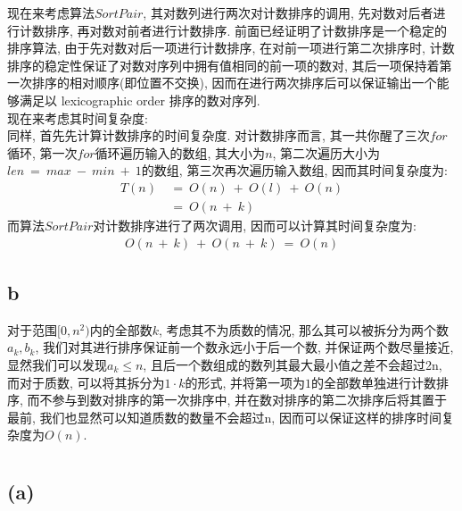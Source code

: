 \documentclass{article}
\begin{document}
现在来考虑算法$SortPair$, 其对数列进行两次对计数排序的调用, 先对数对后者进行计数排序, 再对数对前者进行计数排序. 前面已经证明了计数排序是一个稳定的排序算法, 由于先对数对后一项进行计数排序, 在对前一项进行第二次排序时, 计数排序的稳定性保证了对数对序列中拥有值相同的前一项的数对, 其后一项保持着第一次排序的相对顺序(即位置不交换), 因而在进行两次排序后可以保证输出一个能够满足以 lexicographic order 排序的数对序列. \\
现在来考虑其时间复杂度: \\
同样, 首先先计算计数排序的时间复杂度. 对计数排序而言, 其一共你醒了三次$for$循环, 第一次$for$循环遍历输入的数组, 其大小为$n$, 第二次遍历大小为$len\ =\ max\ -\ min\ +\ 1$的数组, 第三次再次遍历输入数组, 因而其时间复杂度为: 
\begin{align*}
T(n)\ &=\ O(n)\ +\ O(l)\ +\ O(n) \\
&=\ O(n\ +\ k)
\end{align*}
而算法$SortPair$对计数排序进行了两次调用, 因而可以计算其时间复杂度为:
\begin{align*}
O(n\ +\ k)\ +\ O(n\ +\ k)\ =\ O(n)
\end{align*}

\subsection{b}
对于范围$[0,n^2)$内的全部数$k$, 考虑其不为质数的情况, 那么其可以被拆分为两个数$a_k, b_k$, 我们对其进行排序保证前一个数永远小于后一个数, 并保证两个数尽量接近, 显然我们可以发现$a_k\leq n$, 且后一个数组成的数列其最大最小值之差不会超过2n, 而对于质数, 可以将其拆分为$1 \cdot k$的形式, 并将第一项为$1$的全部数单独进行计数排序, 而不参与到数对排序的第一次排序中, 并在数对排序的第二次排序后将其置于最前, 我们也显然可以知道质数的数量不会超过n, 因而可以保证这样的排序时间复杂度为$O(n)$.


\section{}
\subsection{(a)}
\end{document}
